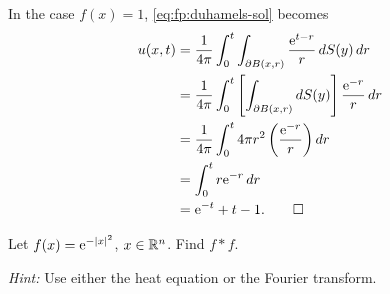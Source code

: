 \begin{solution*}
  In the case \(f(x)=1\), \eqref{eq:fp:duhamels-sol} becomes
  \begin{align*}
    u(x,t)
    &=\frac{1}{4\pi}
      \int_0^t\int_{\partial B(x,r)}\frac{\mathrm{e}^{t-r}}{r}\mathop{}\!d S(y)\mathop{}\!d
      r\\
    &=\frac{1}{4\pi}\int_0^t
      \left[\int_{\partial B(x,r)}\mathop{}\!d S(y)\right]\frac{\mathrm{e}^{-r}}{r}\mathop{}\!d r\\
    &=\frac{1}{4\pi}\int_0^t 4\pi r^2\left(\frac{\mathrm{e}^{-r}}{r}\right)\mathop{}\!d
      r\\
    &=\int_0^tr\mathrm{e}^{-r}\mathop{}\!d r\\
    &=\mathrm{e}^{-t}+t-1.\qedhere
  \end{align*}
\end{solution*}

\begin{problem}
  Let \(f(x)=\mathrm{e}^{-|x|^2}\), \(x\in\mathbb{R}^n\). Find \(f*f\).

  \noindent\emph{Hint:} Use either the heat equation or the Fourier transform.
\end{problem}
